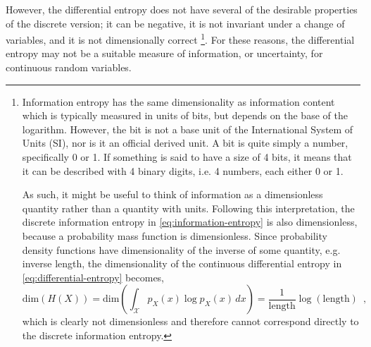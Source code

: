 However, the differential entropy does not have several of the desirable properties of the discrete version; it can be negative, it is not invariant under a change of variables, and it is not dimensionally correct%
\footnote{\label{fn:dimensional-analysis-of-differential-entropy}
    Information entropy has the same dimensionality as information content which is typically measured in units of bits, but depends on the base of the logarithm. 
    However, the bit is not a base unit of the International System of Units (SI), nor is it an official derived unit.
    A bit is quite simply a number, specifically 0 or 1. If something is said to have a size of 4 bits, it means that it can be described with 4 binary digits, i.e. 4 numbers, each either 0 or 1.

    As such, it might be useful to think of information as a dimensionless quantity rather than a quantity with units.
    Following this interpretation, the discrete information entropy in \cref{eq:information-entropy} is also dimensionless, because a probability mass function is dimensionless. 
    Since probability density functions have dimensionality of the inverse of some quantity, e.g. inverse length, the dimensionality of the continuous differential entropy in \cref{eq:differential-entropy} becomes,
    \begin{equation*}
        \text{dim} \left( H(X) \right) = \text{dim} \left( \int_{\mathcal{X}} p_X(x) \log p_X(x) \, dx \right) = \frac{1}{\text{length}} \log\left(\text{length}\right) \enspace ,
    \end{equation*}
    which is clearly not dimensionless and therefore cannot correspond directly to the discrete information entropy.
}. 
For these reasons, the differential entropy may not be a suitable measure of information, or uncertainty, for continuous random variables. 

